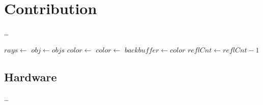 
\section{Contribution}
\ldots

\begin{algorithm}
\begin{algorithmic}[1]
\caption{Na{\"i}ve ray tracing algorithm}\label{algrt}
\State $rays\gets$
    \State $obj\gets objs$
\EndIf
\State $color\gets$
\State $color\gets$
\EndFor
\State $backbuffer\gets color$
\EndFor
\State $reflCnt\gets reflCnt - 1$
\EndWhile
\EndProcedure
\end{algorithmic}
\end{algorithm}

\begin{algorithm}
\begin{algorithmic}[1]
\caption{Foveated ray tracing algorithm}\label{algfov}
\EndProcedure
\end{algorithmic}
\end{algorithm}



\subsection{Hardware}
\ldots
